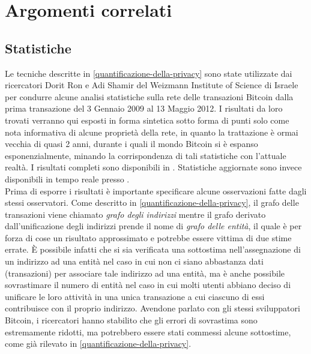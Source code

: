 \chapter{Argomenti correlati}

\section{Statistiche}

Le tecniche descritte in \ref{quantificazione-della-privacy} sono state utilizzate dai ricercatori Dorit Ron e Adi Shamir del Weizmann Institute of Science di Israele per condurre alcune analisi statistiche sulla rete delle transazioni Bitcoin dalla prima transazione del 3 Gennaio 2009 al 13 Maggio 2012. I risultati da loro trovati verranno qui esposti in forma sintetica sotto forma di punti solo come nota informativa di alcune proprietà della rete, in quanto la trattazione è ormai vecchia di quasi 2 anni, durante i quali il mondo Bitcoin si è espanso esponenzialmente, minando la corrispondenza di tali statistiche con l'attuale realtà. I risultati completi sono disponibili in \cite{transazioni}. Statistiche aggiornate sono invece disponibili in tempo reale presso \cite{blockchain-info}.\\

Prima di esporre i risultati è importante specificare alcune osservazioni fatte dagli stessi osservatori. Come descritto in \ref{quantificazione-della-privacy}, il grafo delle transazioni viene chiamato \emph{grafo degli indirizzi} mentre il grafo derivato dall'unificazione degli indirizzi prende il nome di \emph{grafo delle entità}, il quale è per forza di cose un risultato approssimato e potrebbe essere vittima di due stime errate. È possibile infatti che si sia verificata una sottostima nell'assegnazione di un indirizzo ad una entità nel caso in cui non ci siano abbastanza dati (transazioni) per associare tale indirizzo ad una entità, ma è anche possibile sovrastimare il numero di entità nel caso in cui molti utenti abbiano deciso di unificare le loro attività in una unica transazione a cui ciascuno di essi contribuisce con il proprio indirizzo. Avendone parlato con gli stessi sviluppatori Bitcoin, i ricercatori hanno stabilito che gli errori di sovrastima sono estremamente ridotti, ma potrebbero essere stati commessi alcune sottostime, come già rilevato in \ref{quantificazione-della-privacy}.\\

